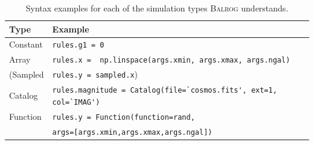 \documentclass[12pt]{book}
\newcommand{\codett}[1]{\lstinline{#1}}
\newcommand{\balrog}{\textsc{Balrog}}
\begin{document}
\begin{table} 
\caption{Syntax examples for each of the simulation types \balrog{} understands.} \label{tab:simtype}
\begin{tabular} {l l}
\toprule \toprule
\textbf{Type} & \textbf{Example} \\ \midrule
Constant & \codett{rules.g1 = 0} \\
Array & \codett{rules.x =  np.linspace(args.xmin, args.xmax, args.ngal)} \\
(Sampled  & \codett{rules.y = sampled.x}) \\
Catalog & \codett{rules.magnitude = Catalog(file=`cosmos.fits', ext=1, col=`IMAG')} \\
Function & \codett{rules.y = Function(function=rand,} \\
 & \hspace{1.55in} \codett{args=[args.xmin,args.xmax,args.ngal])} \\ \bottomrule \bottomrule
\end{tabular}
\end{table}
\end{document}

